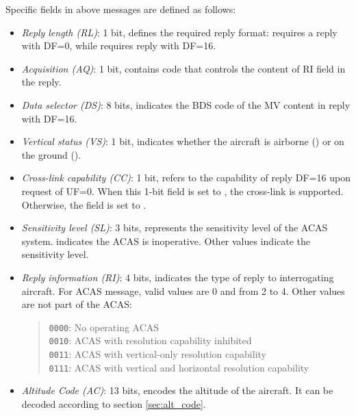 Specific fields in above messages are defined as follows:

\begin{itemize}
  \item \emph{Reply length (RL)}: 1 bit, defines the required reply format: \0 requires a reply with DF=0, while \1 requires reply with DF=16.

  \item \emph{Acquisition (AQ)}: 1 bit, contains code that controls the content of RI field in the reply.

  \item \emph{Data selector (DS)}: 8 bits, indicates the BDS code of the MV content in reply with DF=16.

  \item \emph{Vertical status (VS)}: 1 bit, indicates whether the aircraft is airborne (\0) or on the ground (\1).

  \item \emph{Cross-link capability (CC)}: 1 bit, refers to the capability of reply DF=16 upon request of UF=0. When this 1-bit field is set to \1, the cross-link is supported. Otherwise, the field is set to \0.

  \item \emph{Sensitivity level (SL)}: 3 bits, represents the sensitivity level of the ACAS system. \0 indicates the ACAS is inoperative. Other values indicate the sensitivity level.

  \item \emph{Reply information (RI)}: 4 bits, indicates the type of reply to interrogating aircraft. For ACAS message, valid values are 0 and from 2 to 4. Other values are not part of the ACAS:

  \begin{quote}
    \texttt{0000}: No operating ACAS \\
    \texttt{0010}: ACAS with resolution capability inhibited \\
    \texttt{0011}: ACAS with vertical-only resolution capability \\
    \texttt{0111}: ACAS with vertical and horizontal resolution capability
  \end{quote}

  \item \emph{Altitude Code (AC)}: 13 bits, encodes the altitude of the aircraft. It can be decoded according to section \ref{sec:alt_code}.

\end{itemize}



